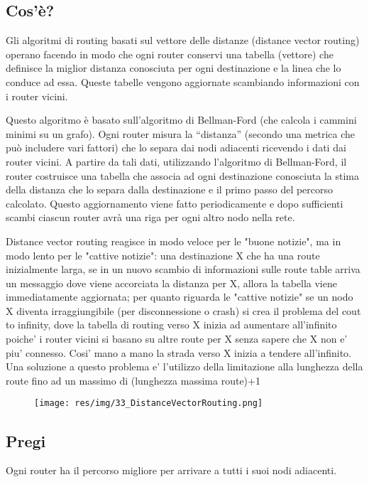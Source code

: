 \subsection{Cos'è?}
Gli algoritmi di routing basati sul vettore delle distanze (distance vector routing) operano facendo in modo che ogni router conservi una tabella (vettore) che definisce la miglior distanza conosciuta per ogni destinazione e la linea che lo conduce ad essa. Queste tabelle vengono aggiornate scambiando informazioni con i router vicini.

Questo algoritmo è basato sull'algoritmo di Bellman-Ford (che calcola i cammini minimi su un grafo).
Ogni router misura la “distanza” (secondo una metrica che può includere vari fattori) che lo separa dai nodi adiacenti ricevendo i dati dai router vicini. A partire da tali dati, utilizzando l'algoritmo di Bellman-Ford, il router costruisce una tabella che associa ad ogni destinazione conosciuta la stima della distanza che lo separa dalla destinazione e il primo passo del percorso calcolato.
Questo aggiornamento viene fatto periodicamente e dopo sufficienti scambi ciascun router avrà una riga per ogni altro nodo nella rete.

Distance vector routing reagisce in modo veloce per le "buone notizie", ma in modo lento per le "cattive notizie": una destinazione X che ha una route inizialmente larga, se in un nuovo scambio di informazioni sulle route table arriva un messaggio dove viene accorciata la distanza per X, allora la tabella viene immediatamente aggiornata; per quanto riguarda le "cattive notizie" se un nodo X diventa irraggiungibile (per disconnessione o crash) si crea il problema del cout to infinity, dove la tabella di routing verso X inizia ad aumentare all'infinito poiche' i router vicini si basano su altre route per X senza sapere che X non e' piu' connesso. Cosi' mano a mano la strada verso X inizia a tendere all'infinito. Una soluzione a questo problema e' l'utilizzo della limitazione alla lunghezza della route fino ad un massimo di (lunghezza massima route)+1

\begin{figure}[H]
\centering
\texttt{[image: res/img/33\_DistanceVectorRouting.png]}
\end{figure} 


\subsection{Pregi}
Ogni router ha il percorso migliore per arrivare a tutti i suoi nodi adiacenti.

